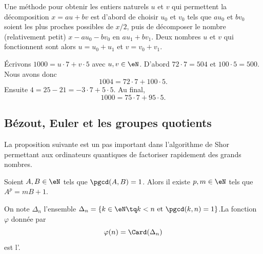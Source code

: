 \begin{normaltext}
    Une méthode pour obtenir les entiers naturels $u$ et $v$ qui permettent la décomposition \(x = au + bv \) est d'abord de choisir $u_0$ et $v_0$ tels que \( au_0 \) et \( bv_0 \) soient les plus proches possibles de $x/2$, puis de décomposer le nombre (relativement petit) \( x - au_0 - bv_0 \) en \( au_1 + bv_1 \). Deux nombres $u$ et $v$ qui fonctionnent sont alors $u = u_0 + u_1$ et $v = v_0 + v_1$.
\end{normaltext}

\begin{example}
    Écrivons \( 1000=u\cdot 7+v\cdot 5\) avec \( u,v\in \eN\). D'abord \( 72\cdot 7=504\) et \( 100\cdot 5=500\). Nous avons donc
    \begin{equation}
        1004=72\cdot 7+100\cdot 5.
    \end{equation}
    Ensuite \( 4=25-21=-3\cdot 7+5\cdot 5\). Au final,
    \begin{equation}
        1000=75\cdot 7+95\cdot 5.
    \end{equation}
\end{example}


\subsection{Bézout, Euler et les groupes quotients}

La proposition suivante est un pas important dans l'algorithme de Shor permettant aux ordinateurs quantiques de factoriser rapidement des grands nombres.

\begin{proposition}       \label{PROPooZCKXooOtocKE}
    Soient \( A,B\in \eN\) tels que \( \pgcd(A,B)=1\). Alors il existe \( p,m\in \eN\) tels que \( A^p=mB+1\).
\end{proposition}

\begin{definition}      \label{DEFooWYIGooRVBTil}
    On note \( \Delta_n \) l'ensemble \( \Delta_n = \{ k \in \eN \tq k < n \text{ et } \pgcd(k,n)=1\} \).La fonction \( \varphi\) donnée par
\begin{equation}    \label{EqEulerGqPsvi}
    \varphi(n)=\Card( \Delta_n )
\end{equation}
est l'.
\end{definition}

